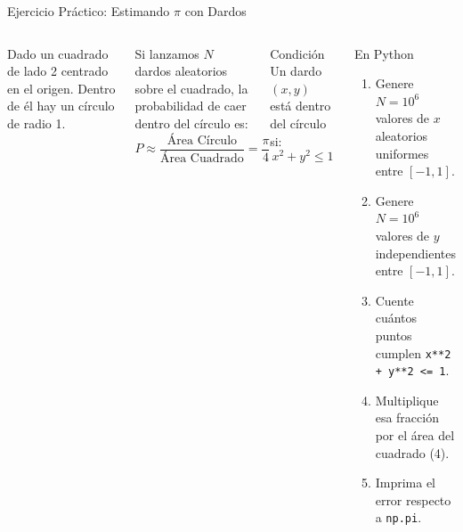 \documentclass[aspectratio=169,10pt]{beamer}
\begin{document}
	\begin{frame}[fragile]{Ejercicio Práctico: Estimando $\pi$ con Dardos}
		\vspace{2pt}
		\begin{columns}[T]
			Dado un cuadrado de lado 2 centrado en el origen. Dentro de él hay un círculo de radio 1.
			
			Si lanzamos $N$ dardos aleatorios sobre el cuadrado, la probabilidad de caer dentro del círculo es:
			\[ P \approx \frac{\text{Área Círculo}}{\text{Área Cuadrado}} = \frac{\pi}{4} \]
			
			\vspace{4pt}
			\begin{obsbox}{Condición}
				Un dardo $(x, y)$ está dentro del círculo si:
				\[ x^2 + y^2 \le 1 \]
			\end{obsbox}
			
			\begin{taskbox}{En Python}
				\begin{enumerate}\small
					\item Genere $N=10^6$ valores de $x$ aleatorios uniformes entre $[-1, 1]$.
					\item Genere $N=10^6$ valores de $y$ independientes entre $[-1, 1]$.
					\item Cuente cuántos puntos cumplen \texttt{x**2 + y**2 <= 1}.
					\item Multiplique esa fracción por el área del cuadrado (4).
					\item Imprima el error respecto a \texttt{np.pi}.
				\end{enumerate}
			\end{taskbox}
		\end{columns}
	\end{frame}
	
\end{document}
